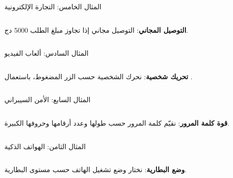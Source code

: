 \begin{frame}[t]{المثال الخامس: التجارة الإلكترونية}
    \begin{columns}[T]
        {\small\textbf{التوصيل المجاني}: التوصيل مجاني إذا تجاوز مبلغ الطلب 5000 دج.\par}
        \vspace{0.3cm}
    \end{columns}
\end{frame}

\begin{frame}[t]{المثال السادس: ألعاب الفيديو}
    \begin{columns}[T]
        {\small\textbf{تحريك شخصية}: نحرك الشخصية حسب الزر المضغوط، باستعمال .\par}
        \vspace{0.3cm}
    \end{columns}
\end{frame}

\begin{frame}[t]{المثال السابع: الأمن السيبراني}
    \begin{columns}[T]
        {\small\textbf{قوة كلمة المرور}: نقيّم كلمة المرور حسب طولها وعدد أرقامها وحروفها الكبيرة.\par}
        \vspace{0.3cm}
    \end{columns}
\end{frame}

\begin{frame}[t]{المثال الثامن: الهواتف الذكية}
    \begin{columns}[T]
        {\small\textbf{وضع البطارية}: نختار وضع تشغيل الهاتف حسب مستوى البطارية.\par}
        \vspace{0.3cm}
    \end{columns}
\end{frame}

